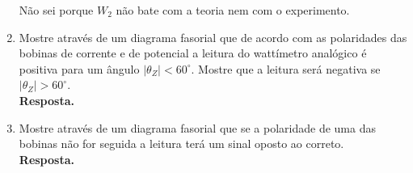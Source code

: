 \documentclass[a4paper,12pt,oneside,openany,table,xcdraw]{article}
\begin{document}
\begin{enumerate}[1)]
\begin{table}[H]\scriptsize
\centering
\def\arraystretch{1.35}
\captionsetup{font=scriptsize}
\caption{Cálculo de $W_1$ e $W_2$ analiticamente.}

\label{w}
\end{table}

Não sei porque $W_2$ não bate com a teoria nem com o experimento.  %

\item  Mostre através de um diagrama fasorial que de acordo com as polaridades das bobinas de corrente e de potencial a leitura do wattímetro analógico é positiva para um ângulo $| \theta_Z| < 60^\circ$. Mostre que a leitura será negativa se $| \theta_Z| > 60^\circ$. \\
\textbf{Resposta.} 

\item  Mostre através de um diagrama fasorial que se a polaridade de uma das bobinas não for seguida a leitura terá um sinal oposto ao correto.  \\
\textbf{Resposta.} 

\end{enumerate}
\end{document}
